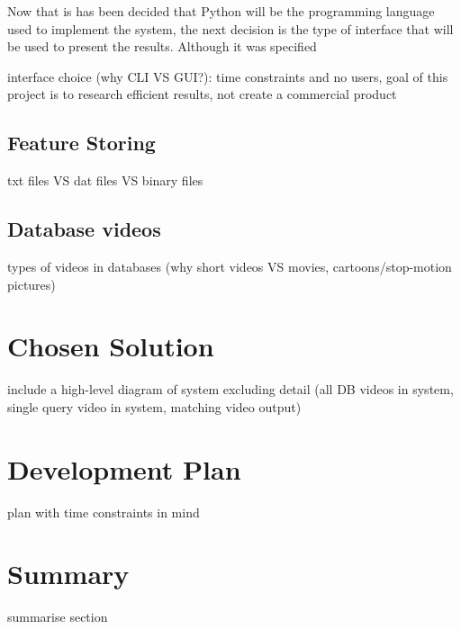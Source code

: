 Now that is has been decided that Python will be the programming language used to implement the system, the next decision is the type of interface that will be used to present the results. Although it was specified

interface choice (why CLI VS GUI?): time constraints and no users, goal of this project is to research efficient results, not create a commercial product

\subsection{Feature Storing}

txt files VS dat files VS binary files

\subsection{Database videos}

types of videos in databases (why short videos VS movies, cartoons/stop-motion pictures)

\section{Chosen Solution}

include a high-level diagram of system excluding detail (all DB videos in system, single query video in system, matching video output)

\section{Development Plan}

plan with time constraints in mind

\section{Summary}

summarise section
